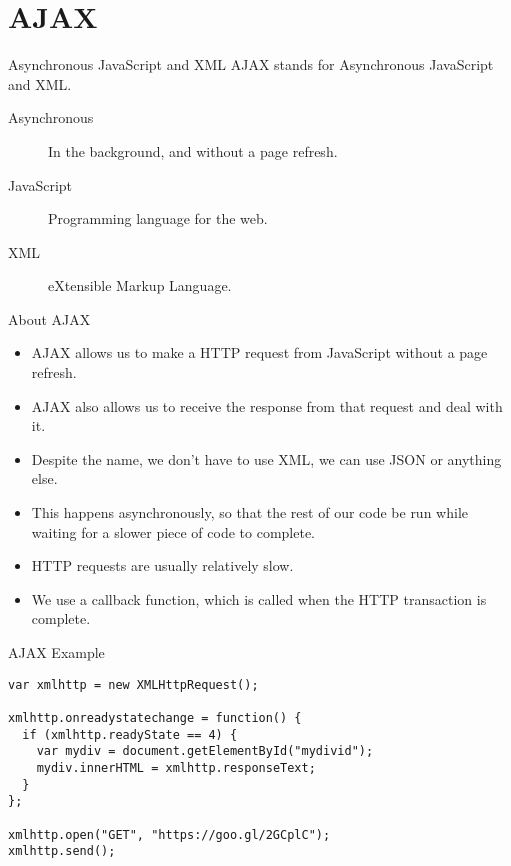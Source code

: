 \section{AJAX}

\begin{frame}{Asynchronous JavaScript and XML}
  AJAX stands for Asynchronous JavaScript and XML.
  \vspace{0.5cm}
  \begin{description}
    \item[Asynchronous] In the background, and without a page refresh.
    \vspace{0.25cm}
    \item[JavaScript] Programming language for the web.
    \vspace{0.25cm}
    \item[XML] eXtensible Markup Language.
  \end{description}
\end{frame}


\begin{frame}{About AJAX}
  \begin{itemize}
    \item AJAX allows us to make a HTTP request from JavaScript without a page refresh.
    \item AJAX also allows us to receive the response from that request and deal with it.
    \item Despite the name, we don't have to use XML, we can use JSON or anything else.
    \item This happens asynchronously, so that the rest of our code be run while waiting for a slower piece of code to complete.
    \item HTTP requests are usually relatively slow.
    \item We use a callback function, which is called when the HTTP transaction is complete.
  \end{itemize}
\end{frame}

\begin{frame}[fragile]{AJAX Example}
  \begin{verbatim}
var xmlhttp = new XMLHttpRequest();

xmlhttp.onreadystatechange = function() {
  if (xmlhttp.readyState == 4) {
    var mydiv = document.getElementById("mydivid");
    mydiv.innerHTML = xmlhttp.responseText;
  }
};

xmlhttp.open("GET", "https://goo.gl/2GCplC");
xmlhttp.send();
  \end{verbatim}
\end{frame}

